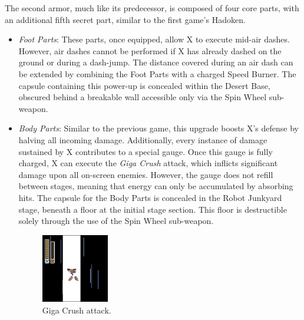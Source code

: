 The second armor, much like its predecessor, is composed of four core parts, with an additional fifth secret part, similar to the first game's Hadoken.
\begin{itemize}
\item \emph{Foot Parts}: These parts, once equipped, allow X to execute mid-air dashes. However, air dashes cannot be performed if X has already dashed on the ground or during a dash-jump. The distance covered during an air dash can be extended by combining the Foot Parts with a charged Speed Burner. The capsule containing this power-up is concealed within the Desert Base, obscured behind a breakable wall accessible only via the Spin Wheel sub-weapon.

\item \emph{Body Parts}: Similar to the previous game, this upgrade boosts X's defense by halving all incoming damage. Additionally, every instance of damage sustained by X contributes to a special gauge. Once this gauge is fully charged, X can execute the \textit{Giga Crush} attack, which inflicts significant damage upon all on-screen enemies. However, the gauge does not refill between stages, meaning that energy can only be accumulated by absorbing hits. The capsule for the Body Parts is concealed in the Robot Junkyard stage, beneath a floor at the initial stage section. This floor is destructible solely through the use of the Spin Wheel sub-weapon.
\begin{figure}[htp]
	\centering
	\includegraphics[height=3cm]{figures/X2/weapons/G_crush_1.png}
	\caption{Giga Crush attack.}
\end{figure}


\end{itemize}
